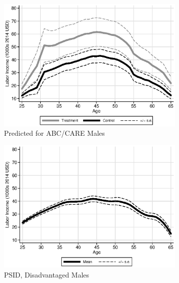 \begin{figure}
\centering
\caption{Labor Income Profiles, Prediction Based on Lagged Labor Income and $X,W,Z$}\label{fig:labor-income-profiles}
\begin{subfigure}[h]{0.4\textwidth}
		\centering
		\caption{Predicted for ABC/CARE Males} \label{fig:abcare1}
		\includegraphics[width=\textwidth]{output/labor_25-60_male_1.eps}
\end{subfigure}%
\begin{subfigure}[h]{0.4\textwidth}
	\centering
	\caption{PSID, Disadvantaged Males} \label{fig:psid1}
		\includegraphics[width=\textwidth]{output/psid_incomeprofiles_s1.eps}
\end{subfigure}
\begin{subfigure}[h]{0.4\textwidth}
		\centering

\end{subfigure}
\end{figure}
